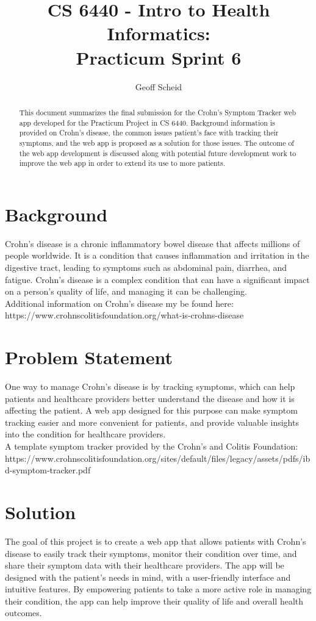 \documentclass[letterpaper]{jdf}
\author{Geoff Scheid}
\title{CS 6440 - Intro to Health Informatics:\\Practicum Sprint 6}
\begin{document}
\maketitle

\begin{abstract}
    This document summarizes the final submission for the Crohn's Symptom Tracker web app developed for the Practicum Project in CS 6440.
    Background information is provided on Crohn's disease, the common issues patient's face with tracking their symptoms, 
    and the web app is proposed as a solution for those issues.
    The outcome of the web app development is discussed along with potential future development work to improve the web app in order to extend its use to more patients.
\end{abstract}

\section{Background}
Crohn's disease is a chronic inflammatory bowel disease that affects millions of people worldwide.
It is a condition that causes inflammation and irritation in the digestive tract, 
leading to symptoms such as abdominal pain, diarrhea, and fatigue. 
Crohn's disease is a complex condition that can have a significant impact on a person's quality of life, 
and managing it can be challenging.\\
Additional information on Crohn's disease my be found here:\\
https://www.crohnscolitisfoundation.org/what-is-crohns-disease

\section{Problem Statement}
One way to manage Crohn's disease is by tracking symptoms, 
which can help patients and healthcare providers better understand the disease and how it is affecting the patient. 
A web app designed for this purpose can make symptom tracking easier and more convenient for patients, 
and provide valuable insights into the condition for healthcare providers.\\
A template symptom tracker provided by the Crohn's and Colitis Foundation:\\
https://www.crohnscolitisfoundation.org/sites/default/files/legacy/assets/pdfs/ibd-symptom-tracker.pdf
\clearpage
\section{Solution}
The goal of this project is to create a web app that allows patients with Crohn's disease to easily track their symptoms, 
monitor their condition over time, and share their symptom data with their healthcare providers. 
The app will be designed with the patient's needs in mind, with a user-friendly interface and intuitive features. 
By empowering patients to take a more active role in managing their condition, 
the app can help improve their quality of life and overall health outcomes.
\end{document}
